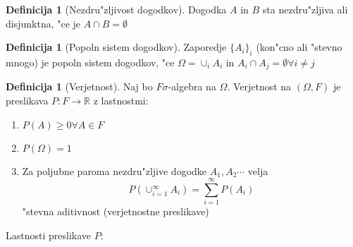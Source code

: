 \documentclass[a4paper,12pt]{article}
\theoremstyle{definition}
\newtheorem{defn}[counter]{Definicija}
\theoremstyle{remark}
\newcommand{\R}{\mathbb{R}}
\begin{document}
\begin{defn}[Nezdru"zljivost dogodkov]
    Dogodka $A$ in $B$ sta nezdru"zljiva ali disjunktna, "ce je $A \cap B = \emptyset$
\end{defn}

\begin{defn}[Popoln sistem dogodkov]
    Zaporedje $\{A_i\}_i$ (kon"cno ali "stevno mnogo) je popoln sistem dogodkov, "ce $\Omega = \cup_i A_i$ in
    $A_i \cap A_j = \emptyset \forall i \neq j$
\end{defn}

\begin{defn}[Verjetnost]
    Naj bo $F \sigma$-algebra na $\Omega$. Verjetnost na $(\Omega, F)$ je preslikava $P: F \to \R$ z lastnostmi:

    \begin{enumerate}
        \item $P(A) \geq 0 \forall A \in F$
        \item $P(\Omega) = 1$ \\
        \item Za poljubne paroma nezdru"zljive dogodke $A_1, A_2 \cdots$ velja
            \begin{equation*}
                P(\cup_{i=1}^{\infty} A_i) = \sum_{i=1}^{\infty} P(A_i)
            \end{equation*}
            "stevna aditivnost (verjetnostne preslikave)
    \end{enumerate}
\end{defn}

Lastnosti preslikave $P$:
\end{document}
